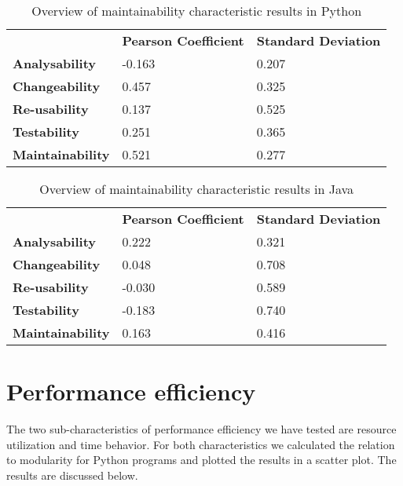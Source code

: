 \documentclass[twoside]{uva-inf-bachelor-thesis}
\begin{document}
\begin{table}[H]
\centering
\caption{Overview of maintainability characteristic results in Python}
\label{table:main-overview}
\begin{tabular}{lll}
                         & \textbf{Pearson Coefficient} & \textbf{Standard Deviation} \\
\textbf{Analysability}   & -0.163                       & 0.207                       \\
\textbf{Changeability}   & 0.457                        & 0.325                       \\
\textbf{Re-usability}    & 0.137                        & 0.525                       \\
\textbf{Testability}     & 0.251                        & 0.365                       \\
\textbf{Maintainability} & 0.521                        & 0.277                      
\end{tabular}
\end{table}

\begin{table}[H]
\centering
\caption{Overview of maintainability characteristic results in Java}
\label{table:main-overview-java}
\begin{tabular}{lll}
                         & \textbf{Pearson Coefficient} & \textbf{Standard Deviation} \\
\textbf{Analysability}   & 0.222                        & 0.321                       \\
\textbf{Changeability}   & 0.048                        & 0.708                       \\
\textbf{Re-usability}    & -0.030                       & 0.589                       \\
\textbf{Testability}     & -0.183                       & 0.740                       \\
\textbf{Maintainability} & 0.163                        & 0.416                      
\end{tabular}
\end{table}

\section{Performance efficiency}
The two sub-characteristics of performance efficiency we have tested are resource utilization and time behavior. For both characteristics we calculated the relation to modularity for Python programs and plotted the results in a scatter plot. The results are discussed below.
\end{document}
